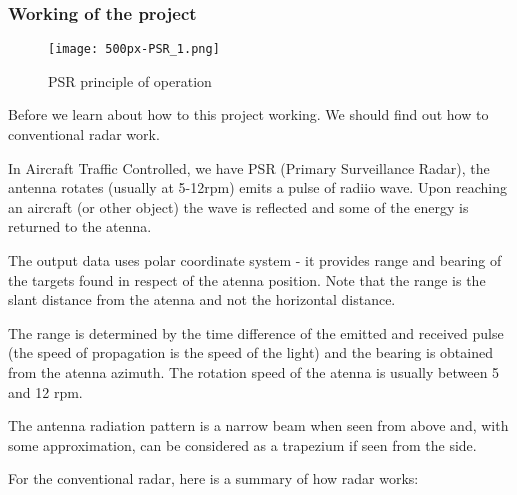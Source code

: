 \documentclass[13pt,a4paper]{report}
\begin{document}
                \subsubsection{\large{Working of the project}}
                    \begin{figure}[H]
                        \centering
                        \texttt{[image: 500px-PSR\_1.png]}
                        \caption{\label{fig:pic}PSR principle of operation}
                    \end{figure}
                    Before we learn about how to this project working. We should find out how to conventional 
                    radar work. \\ 
                    \vspace{1mm}
                    \par In Aircraft Traffic Controlled, we have PSR (Primary Surveillance Radar), the antenna 
                    rotates (usually at 5-12rpm) emits a pulse of radiio wave. Upon reaching an aircraft 
                    (or other object) the wave is reflected and some of the energy is returned to the atenna.
                    \vspace{1mm}
                    \par The output data uses polar coordinate system - it provides range and bearing of the targets 
                    found in respect of the atenna position. Note that the range is the slant distance from 
                    the atenna and not the horizontal distance. \\ 
                    \vspace{1mm}
                    \par The range is determined by the time difference of the emitted and received pulse 
                    (the speed of propagation is the speed of the light) and the bearing is obtained from the 
                    atenna azimuth. The rotation speed of the atenna is usually between 5 and 12 rpm. \\
                    \vspace{1mm}
                    \par The antenna radiation pattern is a narrow beam when seen from above and, with some 
                    approximation, can be considered as a trapezium if seen from the side. \\
                    \vspace{1mm}
                    \par For the conventional radar, here is a summary of how radar works:
\end{document}
